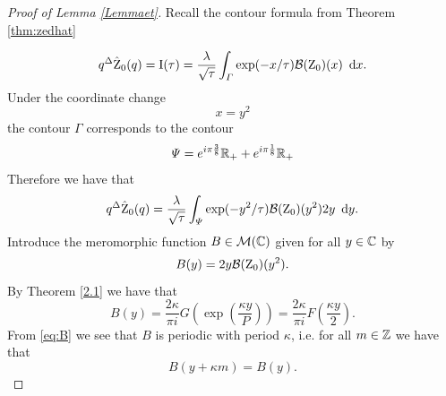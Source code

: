 \begin{proof}[Proof of Lemma \ref{Lemmaet}]
	
 Recall the contour formula from Theorem \ref{thm:zedhat}

\begin{equation}
q^{\Delta} \hat{\operatorname{Z}}_0(q) =\operatorname{I}(\tau) = \frac{\lambda}{\sqrt{\tau}} \int_{\varGamma} \exp(-x /\tau) \mathcal{B}(\operatorname{Z}_0)(x) \ \operatorname{{d}\hskip-.6mm} x.
\end{equation}
Under the coordinate change
\begin{equation}
x=y^2
\end{equation} the contour $\varGamma$ corresponds to the contour
\begin{equation} 
\varPsi= e^{i\pi \frac38}\mathbb{R}_{+}+e^{i\pi \frac18}\mathbb{R}_+
\end{equation} 
Therefore we have that
\begin{equation}
q^{\Delta} \hat{\operatorname{Z}}_0(q)= \frac{\lambda}{\sqrt{\tau}} \int_{\varPsi} \exp(-y^2 /\tau) \mathcal{B}(\operatorname{Z}_0)(y^2)2y \ \operatorname{{d}\hskip-.6mm} y.
\end{equation} 
Introduce the meromorphic function $B \in \mathcal{M}(\mathbb{C}) $ given for all $y \in \mathbb{C}$ by \begin{equation} \label{eq:defB} B(y)=2y\mathcal{B}(\operatorname{Z}_0)(y^2).
\end{equation}  By Theorem \ref{2.1} we have that
\begin{equation} \label{eq:B}
B(y)= \frac{2\kappa}{\pi i} G\left( \exp\left(\frac{\kappa y}{P}\right)\right)=\frac{2\kappa}{\pi i} F\left(\frac{\kappa y}{2}\right).
\end{equation}
From \eqref{eq:B} we see that $B$ is periodic with period $\kappa$, i.e. for all $m\in \mathbb{Z}$ we have that 
\begin{equation} \label{eq:periodicity}
B(y+\kappa m)=B(y).
\end{equation}




\end{proof}
